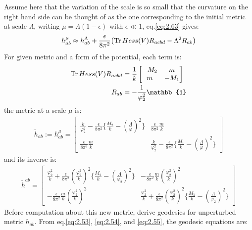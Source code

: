 Assume here that the variation of the scale is so small that the curvature on the right hand side can be thought of as the one corresponding to the initial metric at scale $\Lambda$, writing $\mu = \Lambda (1-\epsilon)$ with $\epsilon \ll 1$, eq.\ref{eq:2.63} gives:
\begin{align}
    h_{ab} ^{\mu} \approx h_{ab} ^{\Lambda} + \frac{\epsilon}{8\pi ^{2}}  \qty (\Tr Hess(V) R_{acbd} - \Lambda ^{2} R_{ab})
\end{align}
For given metric and a form of the potential, each term is:
\begin{align}
    \Tr Hess(V) R_{acbd} &= \frac{1}{k} 
    \begin{bmatrix}
        -M_{2} & m \\
        m & -M_{1}
    \end{bmatrix} \\
    R_{ab} &= -\frac{1}{\varphi_{2} ^{2}} \mathbb{1}
\end{align}
the metric at a scale $\mu$ is:
\begin{align}
    \tilde h_{ab} := h_{ab} ^{\mu} = 
    \begin{bmatrix}
        \frac{k}{\varphi _{2} ^{2}} - \frac{\epsilon}{8\pi^{2}} \lbrace \frac{M_{2}}{k} - (\frac{\Lambda}{\varphi})^{2} \rbrace & \frac{\epsilon}{8\pi^{2}} \frac{m}{k} \\
        \frac{\epsilon}{8\pi^{2}} \frac{m}{k} & \frac{k}{\varphi _{2} ^{2}} - \frac{\epsilon}{8\pi^{2}} \lbrace \frac{M_{1}}{k} - (\frac{\Lambda}{\varphi})^{2} \rbrace
    \end{bmatrix}
\end{align}
and its inverse is:
\begin{align}
    \tilde h^{ab} = 
    \begin{bmatrix}
        \frac{\varphi_{2}^{2}}{k} + \frac{\epsilon}{8\pi^{2}}(\frac{\varphi_{2}^{2}}{k})^{2} \lbrace \frac{M_{2}}{k} - (\frac{\Lambda}{\varphi_{2}})^{2} \rbrace & -\frac{\epsilon}{8\pi^{2}} \frac{m}{k}(\frac{\varphi_{2}^{2}}{k})^{2} \\
        -\frac{\epsilon}{8\pi^{2}} \frac{m}{k}(\frac{\varphi_{2}^{2}}{k})^{2} & \frac{\varphi_{2}^{2}}{k} + \frac{\epsilon}{8\pi^{2}}(\frac{\varphi_{2}^{2}}{k})^{2} \lbrace \frac{M_{1}}{k} - (\frac{\Lambda}{\varphi_{2}})^{2} \rbrace
    \end{bmatrix}
\end{align}
Before computation about this new metric, derive geodesics for unperturbed metric $h_{ab}$. From eq.\ref{eq:2.53}, \ref{eq:2.54}, and \ref{eq:2.55}, the geodesic equations are:
